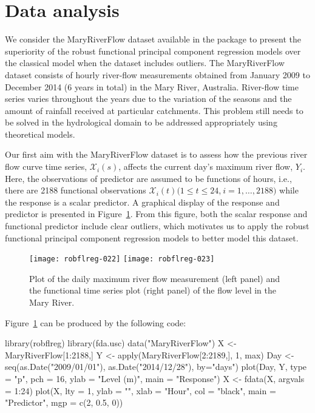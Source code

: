 \section{Data analysis}

We consider the MaryRiverFlow dataset available in the  package to present the superiority of the robust functional principal component regression models over the classical model when the dataset includes outliers. The MaryRiverFlow dataset consists of hourly river-flow measurements obtained from January 2009 to December 2014 (6 years in total) in the Mary River, Australia. River-flow time series varies throughout the years due to the variation of the seasons and the amount of rainfall received at particular catchments. This problem still needs to be solved in the hydrological domain to be addressed appropriately using theoretical models.

Our first aim with the MaryRiverFlow dataset is to assess how the previous river flow curve time series, $\mathcal{X}_i(s)$, affects the current day's maximum river flow, $Y_i$. Here, the observations of predictor are assumed to be functions of hours, i.e., there are 2188 functional observations $\mathcal{X}_i(t) \big(1\leq t\leq 24$,$~ i=1, \ldots, 2188 \big)$ while the response is a scalar predictor. A graphical display of the response and predictor is presented in Figure~\ref{fig:7}. From this figure, both the scalar response and functional predictor include clear outliers, which motivates us to apply the robust functional principal component regression models to better model this dataset.

\begin{figure}[!htb]
  \begin{center}
\texttt{[image: robflreg-022]}
\texttt{[image: robflreg-023]}
\end{center}
\caption{Plot of the daily maximum river flow measurement (left panel) and the functional time series plot (right panel) of the flow level in the Mary River.}\label{fig:7}
\end{figure}

Figure~\ref{fig:7} can be produced by the following code:
\begin{smallexample}
\begin{smallverbatim}
library(robflreg)
library(fda.usc)
data("MaryRiverFlow")
X <- MaryRiverFlow[1:2188,]
Y <- apply(MaryRiverFlow[2:2189,], 1, max)
Day <- seq(as.Date("2009/01/01"), as.Date("2014/12/28"), by="days")
plot(Day, Y, type = "p", pch = 16, ylab = "Level (m)", main = "Response")
X <- fdata(X, argvals = 1:24)
plot(X, lty = 1, ylab = "", xlab = "Hour", col = "black",
     main = "Predictor", mgp = c(2, 0.5, 0))
\end{smallverbatim}
\end{smallexample}

